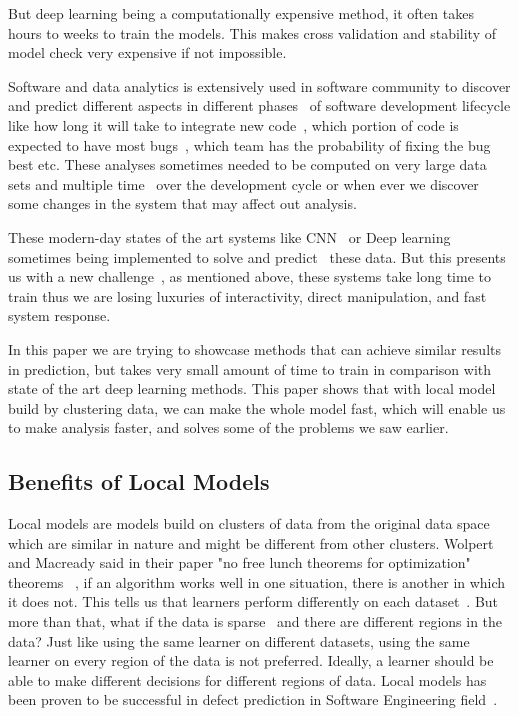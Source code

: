 \documentclass[sigconf]{acmart}
\theoremstyle{break}
\begin{document}
    But deep learning being a computationally expensive method, it often takes hours to weeks to train the models. This makes cross validation and stability of model check very expensive if not impossible. 

    Software and data analytics is extensively used in software community to discover and predict different aspects in different phases~\cite{ghezzi2002fundamentals} of software development lifecycle like how long it will take to integrate new code~\cite{herbsleb1999splitting}, which portion of code is expected to have most bugs~\cite{menzies2007data}, which team has the probability of fixing the bug best etc. These analyses sometimes needed to be computed on very large data sets and multiple time~\cite{fenton2007predicting} over the development cycle or when ever we discover some changes in the system that may affect out analysis. 
    
    These modern-day states of the art systems like CNN~\cite{lai2015recurrent} or Deep learning~\cite{lecun2015deep} sometimes being implemented to solve and predict~\cite{yang2015deep,white2016deep} these data. But this presents us with a new challenge~\cite{chen2014big}, as mentioned above, these systems take long time to train thus we are losing luxuries of interactivity, direct manipulation, and fast system response. 
    
    In this paper we are trying to showcase methods that can achieve similar results in prediction, but takes very small amount of time to train in comparison with state of the art deep learning methods. This paper shows that with local model~\cite{menzies2011local} build by clustering data, we can make the whole model fast, which will enable us to make analysis faster, and solves some of the problems we saw earlier.

    
    \subsection{Benefits of Local Models}
    \label{sssec:Benefits of Local Models}
    Local models are models build on clusters of data from the original data space which are similar in nature and might be different from other clusters. Wolpert and Macready said in their paper "no free lunch theorems for optimization" theorems ~\cite{wolpert1997no}, if an algorithm works well in one situation, there is another in which it does not. This tells us that learners perform differently on each dataset~\cite{agrawal2017better}. But more than that, what if the data is sparse~\cite{xia2008local} and there are different regions in the data? Just like using the same learner on different datasets, using the same learner on every region of the data is not preferred. Ideally, a learner should be able to make different decisions for different regions of data. Local models has been proven to be successful in defect prediction in Software Engineering field~\cite{menzies2007data,menzies2011local,menzies2013local}.
    
\end{document}
